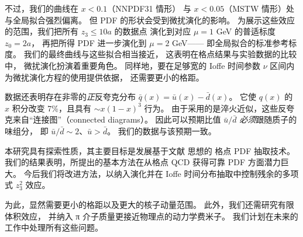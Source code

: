 不过，我们的曲线在 $x <0.1$（NNPDF31 情形）
与 $x <0.05$（MSTW 情形）处与全局拟合强烈偏离。
但 PDF 的形状会受到微扰演化的影响。
为展示这些效应的范围，我们把所有 $z_3 \leq 10a$ 的数据点
演化到对应 $\mu =1 $ GeV 的普适标度 $z_0=2a$，
再把所得 PDF 进一步演化到 $\mu =2 $ GeV——
即全局拟合的标准参考标度。
我们的最终曲线与这些拟合相当接近，
这表明在格点结果与实验数据的比较中，
微扰演化扮演着重要角色。
同样地，要在足够宽的 Ioffe 时间参数 $\nu$ 区间内为微扰演化方程的使用提供依据，
还需要更小的格距。


数据还表明存在非零的{\it 正}反夸克分布 $\bar q (x) = \bar u(x) - \bar d(x)$。
它使 $q(x)$ 的 $x$ 积分改变 7\%，且具有 $\sim x (1-x)^3$ 行为。
由于采用的是淬火近似，这些反夸克来自“连接图”（connected diagrams）。
因此可以预期比值 $\bar u/\bar d$ {\it 必须}跟随质子的味组分，
即 $\bar u/\bar d \sim 2$、$\bar u >\bar d$。
我们的数据与该预期一致。

本研究具有探索性质，其主要目标是发展基于文献 \cite{Radyushkin:2017cyf} 思想的
格点 PDF 抽取技术。
我们的结果表明，所提出的基本方法在从格点 QCD 获得可靠 PDF 方面潜力巨大。
今后我们将改进方法，以纳入演化并在 Ioffe 时间分布抽取中控制残余的多项式 $z_3^2$ 效应。

为此，显然需要更小的格距以及更大的核子动量范围。
此外，我们还需研究有限体积效应，
并纳入 π 介子质量更接近物理点的动力学费米子。
我们计划在未来的工作中处理所有这些问题。
